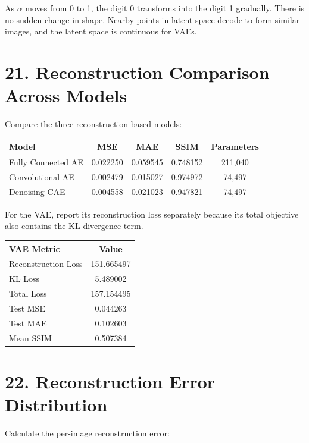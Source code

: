 \documentclass[10pt]{article}
\begin{document}
As $\alpha$ moves from 0 to 1, the digit 0 transforms into the digit 1 gradually. There is no sudden change in shape. Nearby points in latent space decode to form similar images, and the latent space is continuous for VAEs.

\section*{21. Reconstruction Comparison Across Models}

Compare the three reconstruction-based models:

\begin{center}
\begin{tabular}{|l|c|c|c|c|}
\hline
Model & MSE & MAE & SSIM & Parameters\\
\hline
Fully Connected AE & 0.022250 & 0.059545 & 0.748152 & 211{,}040\\
Convolutional AE & 0.002479 & 0.015027 & 0.974972 & 74{,}497\\
Denoising CAE & 0.004558 & 0.021023 & 0.947821 & 74{,}497\\
\hline
\end{tabular}
\end{center}

For the VAE, report its reconstruction loss separately because its total
objective also contains the KL-divergence term.

\begin{center}
\begin{tabular}{|l|c|}
\hline
VAE Metric & Value\\
\hline
Reconstruction Loss & 151.665497\\
KL Loss & 5.489002\\
Total Loss & 157.154495\\
Test MSE & 0.044263\\
Test MAE & 0.102603\\
Mean SSIM & 0.507384\\
\hline
\end{tabular}
\end{center}

\section*{22. Reconstruction Error Distribution}

Calculate the per-image reconstruction error:
\end{document}
